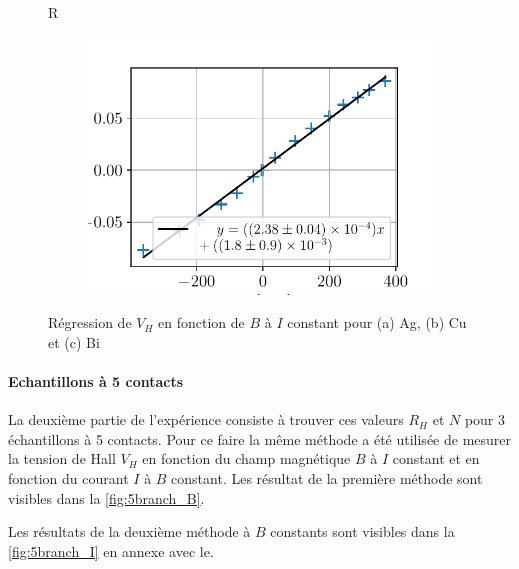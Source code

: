 \begin{figure}{R}
\begin{subfigure}{0.5\textwidth}
        \includegraphics[width=\linewidth]{figures/Bi_B.pdf}
        \caption{}
        \label{fig:Bi_B}
    \end{subfigure}

    \caption{Régression de \(V_H\) en fonction de \(B\) à \(I\) constant pour (a) Ag, (b) Cu et (c) Bi}
    \label{fig:5branch_B}
    \vspace*{1cm}
\end{figure}

\paragraph*{Echantillons à 5 contacts}

La deuxième partie de l'expérience consiste à trouver ces valeurs \(R_H\) et \(N\) pour 3 échantillons à 5 contacts. Pour ce faire la même méthode a été utilisée de mesurer la tension de Hall \(V_H\) en fonction du champ magnétique \(B\) à \(I\) constant et en fonction du courant \(I\) à \(B\) constant. Les résultat de la première méthode sont visibles dans la \autoref{fig:5branch_B}.

Les résultats de la deuxième méthode à \(B\) constants sont visibles dans la \autoref{fig:5branch_I} en annexe avec le.



